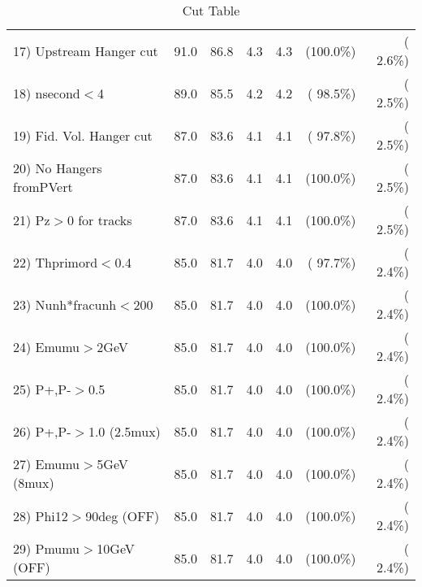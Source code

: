 \begin{table}[h!]
\begin{tabular}{||l||r|r|r|r|r|r||}
 17) Upstream Hanger cut  &         91.0 &         86.8 &          4.3 &          4.3 & (100.0\%) & (  2.6\%) \\
 18) nsecond$<$4          &         89.0 &         85.5 &          4.2 &          4.2 & ( 98.5\%) & (  2.5\%) \\
 19) Fid. Vol. Hanger cut &         87.0 &         83.6 &          4.1 &          4.1 & ( 97.8\%) & (  2.5\%) \\
 20) No Hangers fromPVert &         87.0 &         83.6 &          4.1 &          4.1 & (100.0\%) & (  2.5\%) \\
 21) Pz$>$0 for tracks    &         87.0 &         83.6 &          4.1 &          4.1 & (100.0\%) & (  2.5\%) \\
 22) Thprimord$<$0.4      &         85.0 &         81.7 &          4.0 &          4.0 & ( 97.7\%) & (  2.4\%) \\
 23) Nunh*fracunh$<$200   &         85.0 &         81.7 &          4.0 &          4.0 & (100.0\%) & (  2.4\%) \\
 24) Emumu$>$2GeV         &         85.0 &         81.7 &          4.0 &          4.0 & (100.0\%) & (  2.4\%) \\
 25) P+,P-$>$0.5          &         85.0 &         81.7 &          4.0 &          4.0 & (100.0\%) & (  2.4\%) \\
 26) P+,P-$>$1.0 (2.5mux) &         85.0 &         81.7 &          4.0 &          4.0 & (100.0\%) & (  2.4\%) \\
 27) Emumu$>$5GeV  (8mux) &         85.0 &         81.7 &          4.0 &          4.0 & (100.0\%) & (  2.4\%) \\
 28) Phi12$>$90deg  (OFF) &         85.0 &         81.7 &          4.0 &          4.0 & (100.0\%) & (  2.4\%) \\
 29) Pmumu$>$10GeV  (OFF) &         85.0 &         81.7 &          4.0 &          4.0 & (100.0\%) & (  2.4\%) \\
 \hline
 \hline
 \end{tabular}
 \caption{Cut Table           }
 \label{tab-cutcohjpsi-mumu_cohphi0}
 \end{table}

